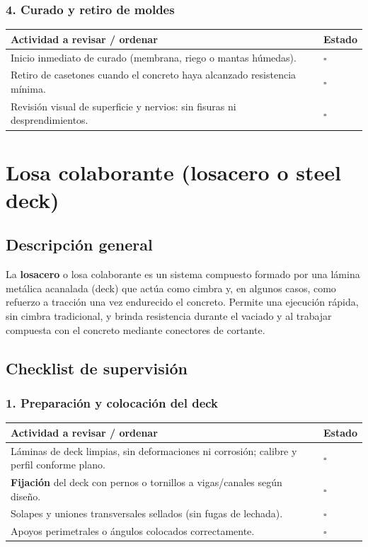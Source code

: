 \documentclass[12pt]{article}
\newcommand{\cbox}{\(\square\)} %
\begin{document}
 \subsubsection*{4. Curado y retiro de moldes}
 \begin{tabularx}{\linewidth}{>{\raggedright\arraybackslash}p{0.93\linewidth} >{\centering\arraybackslash}m{0.07\linewidth}}
 	\toprule
 	\textbf{Actividad a revisar / ordenar} & \textbf{Estado}\\
 	\midrule
 	Inicio inmediato de curado (membrana, riego o mantas húmedas). & \cbox \\
 	Retiro de casetones cuando el concreto haya alcanzado resistencia mínima. & \cbox \\
 	Revisión visual de superficie y nervios: sin fisuras ni desprendimientos. & \cbox \\
 	\bottomrule
 \end{tabularx}
 
 
 \section{Losa colaborante (losacero o steel deck)}
 
 \subsection*{Descripción general}
 La \textbf{losacero} o losa colaborante es un sistema compuesto formado por una lámina metálica acanalada (deck) que actúa como cimbra y, en algunos casos, como refuerzo a tracción una vez endurecido el concreto. Permite una ejecución rápida, sin cimbra tradicional, y brinda resistencia durante el vaciado y al trabajar compuesta con el concreto mediante conectores de cortante.
 
 
 
 \subsection{Checklist de supervisión}
 
 \subsubsection*{1. Preparación y colocación del deck}
 \begin{tabularx}{\linewidth}{>{\raggedright\arraybackslash}p{0.93\linewidth} >{\centering\arraybackslash}m{0.07\linewidth}}
 	\toprule
 	\textbf{Actividad a revisar / ordenar} & \textbf{Estado}\\
 	\midrule
 	Láminas de deck limpias, sin deformaciones ni corrosión; calibre y perfil conforme plano. & \cbox \\
 	\textbf{Fijación} del deck con pernos o tornillos a vigas/canales según diseño. & \cbox \\
 	Solapes y uniones transversales sellados (sin fugas de lechada). & \cbox \\
 	Apoyos perimetrales o ángulos colocados correctamente. & \cbox \\
 	\bottomrule
 \end{tabularx}
 
\end{document}
